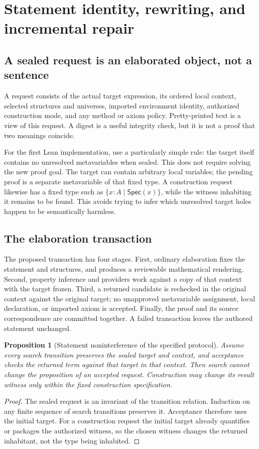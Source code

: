 \documentclass[11pt,a4paper]{article}
\newtheorem{proposition}[theorem]{Proposition}
\theoremstyle{definition}
\theoremstyle{remark}
\newcommand{\Spec}{\mathsf{Spec}}
\begin{document}
\section{Statement identity, rewriting, and incremental repair}
\label{sec:identity}

\subsection{A sealed request is an elaborated object, not a sentence}
A request consists of the actual target expression, its ordered local context,
selected structures and universes, imported environment identity, authorized
construction mode, and any method or axiom policy. Pretty-printed text is a
view of this request. A digest is a useful integrity check, but it is not a
proof that two meanings coincide.

For the first Lean implementation, use a particularly simple rule: the target
itself contains no unresolved metavariables when sealed. This does not require
solving the new proof goal. The target can contain arbitrary local variables;
the pending proof is a separate metavariable of that fixed type. A construction
request likewise has a fixed type such as $\{x:A\mid\Spec(x)\}$, while the
witness inhabiting it remains to be found. This avoids trying to infer which
unresolved target holes happen to be semantically harmless.

\subsection{The elaboration transaction}
The proposed transaction has four stages.
First, ordinary elaboration fixes the statement and structures, and produces a
reviewable mathematical rendering. Second, property inference and providers
work against a copy of that context with the target frozen. Third, a returned
candidate is rechecked in the original context against the original target;
no unapproved metavariable assignment, local declaration, or imported axiom is
accepted. Finally, the proof and its source correspondence are committed
together. A failed transaction leaves the authored statement unchanged.

\begin{proposition}[Statement noninterference of the specified protocol]
Assume every search transition preserves the sealed target and context, and
acceptance checks the returned term against that target in that context. Then
search cannot change the proposition of an accepted request. Construction may
change its result witness only within the fixed construction specification.
\end{proposition}
\begin{proof}
The sealed request is an invariant of the transition relation. Induction on
any finite sequence of search transitions preserves it. Acceptance therefore
uses the initial target. For a construction request the initial target already
quantifies or packages the authorized witness, so the chosen witness changes
the returned inhabitant, not the type being inhabited.
\end{proof}
\end{document}
